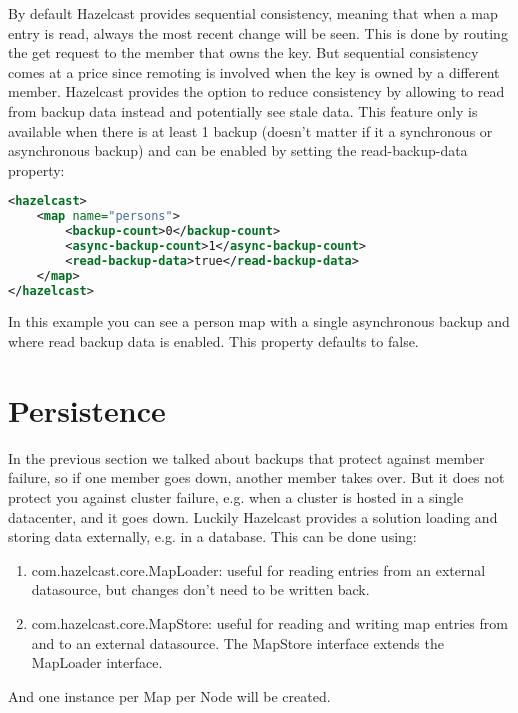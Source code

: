 By default Hazelcast provides sequential consistency, meaning that when a map entry is read, always the most recent change will be seen. This is done by routing the get request to the member that owns the key. But sequential consistency comes at a price since remoting is involved when the key is owned by a different member. Hazelcast provides the option to reduce consistency by allowing to read from backup data instead and potentially see stale data. This feature only is available when there is at least 1 backup (doesn't matter if it a synchronous or asynchronous backup) and can be enabled by setting the read-backup-data property:
\begin{lstlisting}[language=xml]
<hazelcast>
    <map name="persons">
        <backup-count>0</backup-count>
        <async-backup-count>1</async-backup-count>
        <read-backup-data>true</read-backup-data>
    </map>
</hazelcast>
\end{lstlisting}
In this example you can see a person map with a single asynchronous backup and where read backup data is enabled. This property defaults to false.

\section{Persistence}
In the previous section we talked about backups that protect against member failure, so if one member goes down, another member takes over. But it does not protect you against cluster failure, e.g. when a cluster is hosted in a single datacenter, and it goes down. Luckily Hazelcast provides a solution loading and storing data externally, e.g. in a database. This can be done using:
\begin{enumerate}
\item com.hazelcast.core.MapLoader: useful for reading entries from an external datasource, but changes don't need to be written back.
\item com.hazelcast.core.MapStore: useful for reading and writing map entries from and to an external datasource. The MapStore interface extends the MapLoader interface.
\end{enumerate}
 And one instance per Map per Node will be created.

